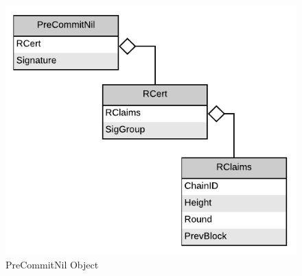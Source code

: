 \begin{figure}[H]
    \centering
    \includegraphics[scale=0.5]{figures/PreCommitNil_Object.pdf}
    \caption{PreCommitNil Object}
\end{figure}
